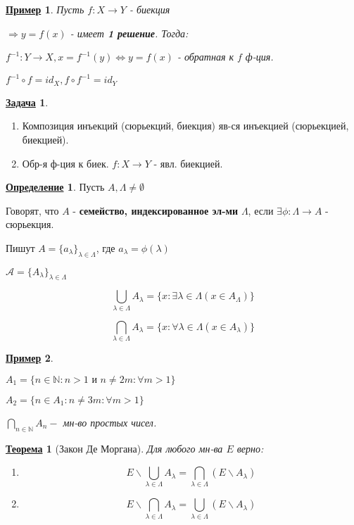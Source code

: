 \documentclass[12pt]{article}
\newcommand{\N}{\mathbb{N}}
\newtheorem{theorem}{\underline{Теорема}}[section]
\newtheorem*{example}{\underline{Пример}}
\theoremstyle{definition}
\newtheorem{definition}{\underline{Определение}}[section]
\theoremstyle{definition}
\newtheorem{task}{\underline{Задача}}[section]
\begin{document}
\begin{example}
Пусть $f: X \rightarrow Y$ - биекция

$\Rightarrow y = f(x)$ - имеет \textbf{1 решение}. Тогда:

$f^{-1}: Y \rightarrow X, x = f^{-1}(y) \iff y = f(x)$ - обратная к $f$ ф-ция.

$f^{-1} \circ f = id_X, f \circ f^{-1} = id_Y$
\end{example}

\begin{task}
\begin{enumerate}
    \item Композиция инъекций (сюрьекций, биекция) яв-ся инъекцией (сюрьекцией, биекцией).
    \item Обр-я ф-ция к биек. $f: X \rightarrow Y$ - явл. биекцией.
\end{enumerate}
\end{task}

\begin{definition}
Пусть $A, \Lambda \neq \emptyset$

Говорят, что $A$ - \textbf{семейство, индексированное эл-ми } $ \Lambda$, если $\exists \phi: \Lambda \rightarrow A$ - сюрьекция.

Пишут $A = \{a_\lambda\}_{\lambda \in \Lambda}$, где $a_\lambda = \phi(\lambda)$
 
$\mathscr{A} = \{A_\lambda\}_{\lambda \in \Lambda}$ 

\[
    \bigcup_{\lambda \in \Lambda} A_\lambda = \{x \colon \exists \lambda \in \Lambda (x \in A_\Lambda)\}
\]

\[
    \bigcap_{\lambda \in \Lambda} A_\lambda = \{x \colon \forall \lambda \in \Lambda (x \in A_\lambda)\}
\]

\end{definition}

\begin{example}
~\newline
    
$A_1 = \{n \in \N \colon n > 1 \text{ и } n \neq 2m \colon \forall m > 1\}$

$A_2 = \{n \in A_1\colon n \neq 3m \colon \forall m > 1\}$

$\bigcap_{n \in \N} A_n - $ мн-во простых чисел.
\end{example}

\begin{theorem}[Закон Де Моргана]
Для любого мн-ва $E$ верно:
\begin{enumerate}
    \item
        \[
            E \backslash \bigcup_{\lambda \in \Lambda} A_\lambda = \bigcap_{\lambda \in \Lambda} (E \backslash A_\lambda)
        \]

    \item
        \[
            E \backslash \bigcap_{\lambda \in \Lambda} A_\lambda = \bigcup_{\lambda \in \Lambda} (E \backslash A_\lambda)
        \]
\end{enumerate}
\end{theorem}
\end{document}
